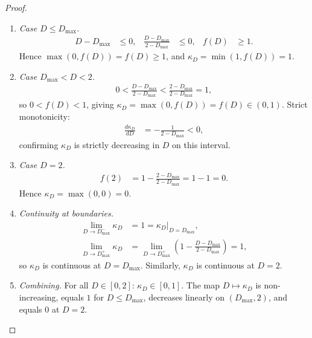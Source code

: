 \documentclass[12pt,openany]{book}
\numberwithin{equation}{chapter}
\theoremstyle{plain}
\theoremstyle{definition}
\theoremstyle{remark}
\numberwithin{equation}{chapter}
\theoremstyle{plain}
\begin{document}
\begin{proof}
\begin{enumerate}
\begin{enumerate}
    \item \emph{Case $D \leq D_{\max}$.}
      \begin{align}
        D - D_{\max} &\leq 0,
        &
        \frac{D - D_{\max}}{2 - D_{\max}} &\leq 0,
        &
        f(D) &\geq 1.
      \end{align}
      Hence $\max(0, f(D)) = f(D) \geq 1$, and
      $\kappa_D = \min(1, f(D)) = 1$.

    \item \emph{Case $D_{\max} < D < 2$.}
      \begin{align}
        0
          < \frac{D - D_{\max}}{2 - D_{\max}}
          < \frac{2 - D_{\max}}{2 - D_{\max}}
          = 1,
      \end{align}
      so $0 < f(D) < 1$, giving
      $\kappa_D = \max(0, f(D)) = f(D) \in (0,1)$.
      Strict monotonicity:
      \begin{align}
        \frac{d\kappa_D}{dD}
          &= -\frac{1}{2 - D_{\max}} < 0,
      \end{align}
      confirming $\kappa_D$ is strictly decreasing in $D$
      on this interval.

    \item \emph{Case $D = 2$.}
      \begin{align}
        f(2)
          &= 1 - \frac{2 - D_{\max}}{2 - D_{\max}}
           = 1 - 1
           = 0.
      \end{align}
      Hence $\kappa_D = \max(0, 0) = 0$.

    \item \emph{Continuity at boundaries.}
      \begin{align}
        \lim_{D \to D_{\max}^-} \kappa_D
          &= 1
           = \kappa_D\big|_{D = D_{\max}},
        \\[4pt]
        \lim_{D \to D_{\max}^+} \kappa_D
          &= \lim_{D \to D_{\max}^+}
             \left(1 - \frac{D - D_{\max}}{2 - D_{\max}}\right)
           = 1,
      \end{align}
      so $\kappa_D$ is continuous at $D = D_{\max}$.
      Similarly, $\kappa_D$ is continuous at $D = 2$.

    \item \emph{Combining.}
      For all $D \in [0,2]$:
      $\kappa_D \in [0,1]$.
      The map $D \mapsto \kappa_D$ is non-increasing,
      equals $1$ for $D \leq D_{\max}$, decreases linearly
      on $(D_{\max}, 2)$, and equals $0$ at $D = 2$.
      \qedhere
  \end{enumerate}

\end{enumerate}
\end{proof}
\end{document}
